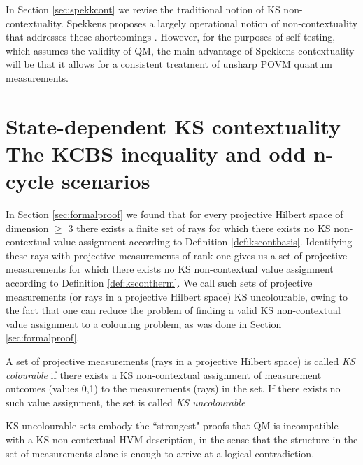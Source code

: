 In Section \ref{sec:spekkcont} we revise the traditional notion of KS non-contextuality. Spekkens proposes a largely operational notion of non-contextuality that addresses these shortcomings \cite{Spekkens2005}. However, for the purposes of self-testing, which assumes the validity of QM, the main advantage of Spekkens contextuality will be that it allows for a consistent treatment of unsharp POVM quantum measurements.

\section[State-dependent KS contextuality\\ The KCBS inequality and odd n-cycle scenarios]{State-dependent KS contextuality \\ \large{The KCBS inequality and odd n-cycle scenarios}}
\label{sec:kcbs}
In Section \ref{sec:formalproof} we found that for every projective Hilbert space of dimension $\geq$ 3 there exists a finite set of rays for which there exists no KS non-contextual value assignment according to Definition \ref{def:kscontbasis}. Identifying these rays with projective measurements of rank one gives us a set of projective measurements for which there exists no KS non-contextual value assignment according to Definition \ref{def:kscontherm}. We call such sets of projective measurements (or rays in a projective Hilbert space) KS uncolourable, owing to the fact that one can reduce the problem of finding a valid KS non-contextual value assignment to a colouring problem, as was done in Section \ref{sec:formalproof}. 
\begin{definition}
A set of projective measurements (rays in a projective Hilbert space) is called \emph{KS colourable} if there exists a KS non-contextual assignment of measurement outcomes (values 0,1) to the measurements (rays) in the set. If there exists no such value assignment, the set is called \emph{KS uncolourable} 
\end{definition}
KS uncolourable sets embody the ``strongest" proofs that QM is incompatible with a KS non-contextual HVM description, in the sense that the structure in the set of measurements alone is enough to arrive at a logical contradiction.
